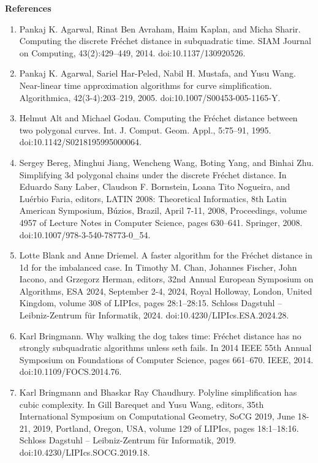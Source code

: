 \par
\par
\par
\par\medskip\noindent\textbf{References}\par
\begin{enumerate}
\item[]  [1]  Pankaj K. Agarwal, Rinat Ben Avraham, Haim Kaplan, and Micha Sharir.  Computing the discrete Fréchet distance in subquadratic time.  SIAM Journal on Computing, 43(2):429–449, 2014.  doi:10.1137/130920526.  
\item[]  [2]  Pankaj K. Agarwal, Sariel Har-Peled, Nabil H. Mustafa, and Yusu Wang.  Near-linear time approximation algorithms for curve simplification.  Algorithmica, 42(3-4):203–219, 2005.  doi:10.1007/S00453-005-1165-Y.  
\item[]  [3]  Helmut Alt and Michael Godau.  Computing the Fréchet distance between two polygonal curves.  Int. J. Comput. Geom. Appl., 5:75–91, 1995.  doi:10.1142/S0218195995000064.  
\item[]  [4]  Sergey Bereg, Minghui Jiang, Wencheng Wang, Boting Yang, and Binhai Zhu.  Simplifying 3d polygonal chains under the discrete Fréchet distance.  In Eduardo Sany Laber, Claudson F. Bornstein, Loana Tito Nogueira, and Luérbio Faria, editors, LATIN 2008: Theoretical Informatics, 8th Latin American Symposium, Búzios, Brazil, April 7-11, 2008, Proceedings, volume 4957 of Lecture Notes in Computer Science, pages 630–641. Springer, 2008.  doi:10.1007/978-3-540-78773-0\_54.  
\item[]  [5]  Lotte Blank and Anne Driemel.  A faster algorithm for the Fréchet distance in 1d for the imbalanced case.  In Timothy M. Chan, Johannes Fischer, John Iacono, and Grzegorz Herman, editors, 32nd Annual European Symposium on Algorithms, ESA 2024, September 2-4, 2024, Royal Holloway, London, United Kingdom, volume 308 of LIPIcs, pages 28:1–28:15. Schloss Dagstuhl – Leibniz-Zentrum für Informatik, 2024.  doi:10.4230/LIPIcs.ESA.2024.28.  
\item[]  [6]  Karl Bringmann.  Why walking the dog takes time: Fréchet distance has no strongly subquadratic algorithms unless seth fails.  In 2014 IEEE 55th Annual Symposium on Foundations of Computer Science, pages 661–670. IEEE, 2014.  doi:10.1109/FOCS.2014.76.  
\item[]  [7]  Karl Bringmann and Bhaskar Ray Chaudhury.  Polyline simplification has cubic complexity.  In Gill Barequet and Yusu Wang, editors, 35th International Symposium on Computational Geometry, SoCG 2019, June 18-21, 2019, Portland, Oregon, USA, volume 129 of LIPIcs, pages 18:1–18:16. Schloss Dagstuhl – Leibniz-Zentrum für Informatik, 2019.  doi:10.4230/LIPIcs.SOCG.2019.18.  

\end{enumerate}
